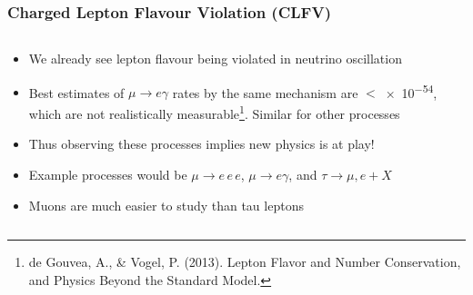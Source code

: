 \documentclass[11pt]{beamer}
\begin{document}
\begin{frame}
\begin{columns}[c]
\begin{column}{0.4\textwidth}
        \end{column}
        
    \end{columns}

    

\end{frame}

\begin{frame}
    \frametitle{Charged Lepton Flavour Violation (CLFV)}
    \begin{columns}[c]
        \begin{column}{0.6\textwidth}
            \begin{itemize}
                \item We already see lepton flavour being violated in neutrino oscillation
                \item Best estimates of $\mu \rightarrow e\gamma$ rates by the same mechanism are $<$\num{e-54}, which are not realistically measurable\footnote[frame]{de Gouvea, A., \& Vogel, P. (2013). Lepton Flavor and Number Conservation, and Physics Beyond the Standard Model.}. Similar for other processes
                \item Thus observing these processes implies new physics is at play!
                \item Example processes would be $\mu\rightarrow e\,e\,e$, $\mu \rightarrow e\gamma$, and $\tau \rightarrow \mu,e + X$
                \item Muons are much easier to study than tau leptons
            \end{itemize}
        \end{column}

        \begin{column}{0.4\textwidth}
        \end{column}
    \end{columns}
\end{frame}
\end{document}

